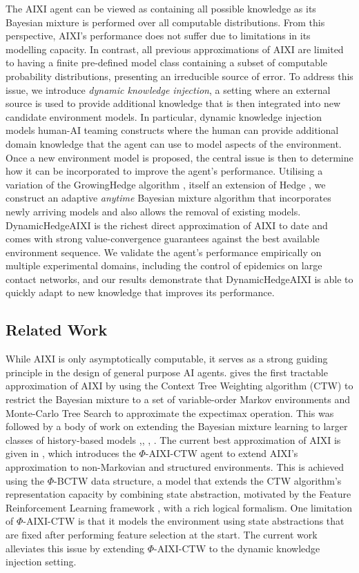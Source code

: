 \documentclass[letterpaper]{article} %
\theoremstyle{definition}
\begin{document}
The AIXI agent can be viewed as containing all possible knowledge as its Bayesian mixture is performed over all computable distributions. From this perspective, AIXI's performance does not suffer due to limitations in its modelling capacity.
In contrast, all previous approximations of AIXI are limited to having a finite pre-defined model class containing a subset of computable probability distributions, presenting an irreducible source of error.
To address this issue, we introduce \textit{dynamic knowledge injection}, a setting where an external source is used to provide additional knowledge that is then integrated into new candidate environment models. 
In particular, dynamic knowledge injection models human-AI teaming constructs where the human can provide additional domain knowledge that the agent can use to model aspects of the environment. 
Once a new environment model is proposed, the central issue is then to determine how it can be incorporated to improve the agent's performance. Utilising a variation of the GrowingHedge algorithm \cite{MM17:growing_expert}, itself an extension of Hedge \cite{cesa2006prediction}, we construct an adaptive \textit{anytime} Bayesian mixture algorithm that incorporates newly arriving models and also allows the removal of existing models.
DynamicHedgeAIXI is the richest direct approximation of AIXI to date and comes with strong value-convergence guarantees against the best available environment sequence.
We validate the agent's performance empirically on multiple experimental domains, including the control of epidemics on large contact networks, and our results demonstrate that DynamicHedgeAIXI is able to quickly adapt to new knowledge that improves its performance. 

\subsection{Related Work}  
While AIXI is only asymptotically computable, it serves as a strong guiding principle in the design of general purpose AI agents. \cite{veness09} gives the first tractable approximation of AIXI by using the Context Tree Weighting algorithm (CTW) \cite{WST95} to restrict the Bayesian mixture to a set of variable-order Markov environments and Monte-Carlo Tree Search to approximate the expectimax operation.
This was followed by a body of work on extending the Bayesian mixture learning to larger classes of history-based models \cite{venessNHB12},\cite{venessWBG13}, \cite{bellemareVB13}, \cite{bellemareVT14}.
The current best approximation of AIXI is given in \cite{yang-zhao2022a}, which introduces the $\Phi$-AIXI-CTW agent to extend AIXI's approximation to non-Markovian and structured environments. This is achieved using the $\Phi$-BCTW data structure, a model that extends the CTW algorithm's representation capacity by combining state abstraction, motivated by the Feature Reinforcement Learning framework \cite{Hutter2009FeatureRL}, with a rich logical formalism. One limitation of $\Phi$-AIXI-CTW is that it models the environment using state abstractions that are fixed after performing feature selection at the start. The current work alleviates this issue by extending $\Phi$-AIXI-CTW to the dynamic knowledge injection setting.
\end{document}
